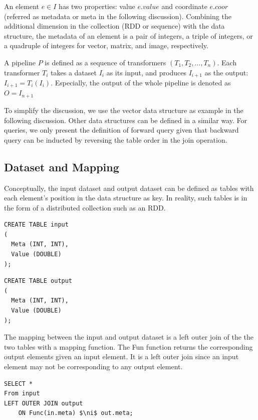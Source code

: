 \documentclass{sig-alternate}
\begin{document}
An element $e \in I$ has two properties: value $e.value$ and coordinate $e.coor$ (referred as metadata or meta
in the following discussion). 
Combining the additional dimension in the collection (RDD or sequence) with the data structure, 
the metadata of an element is a pair of integers, a triple of integers, or a quadruple of integers
for vector, matrix, and image, respectively.

A pipeline $P$ is defined as a sequence of transformers $(T_1, T_2, ..., T_n)$. 
Each transformer $T_i$ takes a dataset $I_i$ as its input, and produces $I_{i+1}$ as the output: 
$I_{i+1} = T_i(I_i)$. 
Especially, the output of the whole pipeline is denoted as $O = I_{n+1}$

To simplify the discussion, we use the vector data structure as example in the following discussion.
Other data structures can be defined in a similar way. 
For queries, we only present the definition of forward query given that backward query can be inducted by reversing
the table order in the join operation.

\subsection{Dataset and Mapping}
\label{sec:formal-ds-mapping}
Conceptually, the input dataset and output dataset can be defined
as tables with each element's position in the data structure as key.
In reality, such tables is in the form of a distributed collection such as an RDD.
\newline\newline
\noindent\begin{minipage}{\textwidth}
\noindent\begin{minipage}{.2\textwidth}
\begin{verbatim}
CREATE TABLE input
(
  Meta (INT, INT),
  Value (DOUBLE)
);
\end{verbatim}
\end{minipage} 
\qquad{\color{black}\vrule}\qquad
\begin{minipage}{.2\textwidth}
\begin{verbatim}
CREATE TABLE output
(
  Meta (INT, INT),
  Value (DOUBLE)
);
\end{verbatim}
\end{minipage}
\end{minipage}
\vspace{2ex}

The mapping between the input and output dataset is a left outer join of the the two tables with a mapping function.
The Fun function returns the corresponding output elements given an input element. 
It is a left outer join since an input element may not be corresponding to any output element.
\begin{lstlisting}
SELECT *
From input
LEFT OUTER JOIN output 
    ON Func(in.meta) $\ni$ out.meta;
\end{lstlisting}
\end{document}
